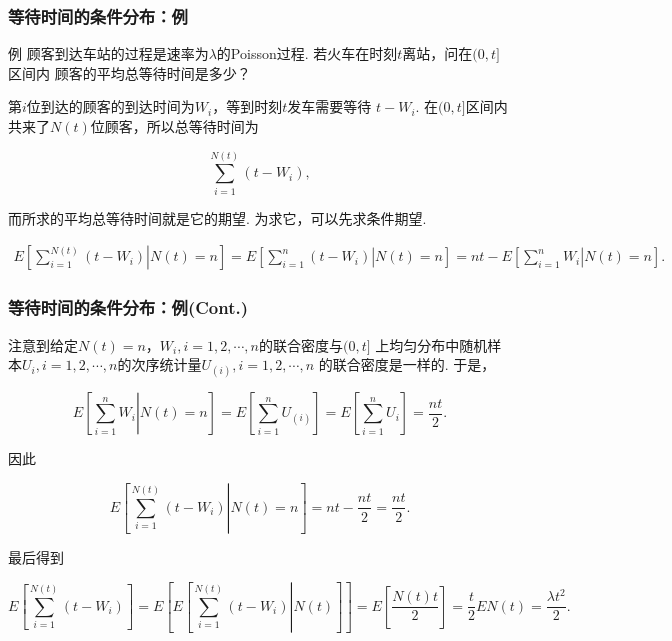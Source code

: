 \begin{frame}
    \frametitle{等待时间的条件分布：例}
    \begin{exampleblock}{例}
        顾客到达车站的过程是速率为$\lambda$的Poisson过程.
        若火车在时刻$t$离站，问在$(0,t]$区间内
        顾客的平均总等待时间是多少？
    \end{exampleblock}
    第$i$位到达的顾客的到达时间为$W_i$，等到时刻$t$发车需要等待
    $t-W_i$. 在$(0,t]$区间内共来了$N(t)$位顾客，所以总等待时间为
    \begin{small}
    \begin{equation*}
        \sum_{i=1}^{N(t)}(t-W_i),
    \end{equation*}
    \end{small}
    而所求的平均总等待时间就是它的期望. 为求它，可以先求条件期望.
    \begin{small}
    \begin{align*}
        E\left[\left.\sum_{i=1}^{N(t)}(t-W_i)\right|N(t)=n\right]
        =E\left[\left.\sum_{i=1}^{n}(t-W_i)\right|N(t)=n\right]
        =nt-E\left[\left.\sum_{i=1}^nW_i\right|N(t)=n\right].
    \end{align*}
    \end{small}
\end{frame}

\begin{frame}
    \frametitle{等待时间的条件分布：例(Cont.)}
    注意到给定$N(t)=n$，$W_i,i=1,2,\cdots,n$的联合密度与$(0,t]$
    上均匀分布中随机样本$U_i,i=1,2,\cdots,n$的次序统计量$U_{(i)},i=1,2,\cdots,n$
    的联合密度是一样的. 于是，
    \begin{small}
        \begin{equation*}
            E\left[\left.\sum_{i=1}^nW_i\right|N(t)=n\right]
            =E\left[\sum_{i=1}^n U_{(i)}\right]
            =E\left[\sum_{i=1}^n U_{i}\right]
            =\frac{nt}2.
        \end{equation*}        
    \end{small}
    因此
    \begin{small}
        \begin{equation*}
            E\left[\left.\sum_{i=1}^{N(t)}(t-W_i)\right|N(t)=n\right]=nt-\frac{nt}2=\frac{nt}2.
        \end{equation*}        
    \end{small}
    最后得到
    \begin{small}
        \begin{equation*}
            E\left[\sum_{i=1}^{N(t)}(t-W_i)\right]
            =E\left[E\left[\left.\sum_{i=1}^{N(t)}(t-W_i)\right|N(t)\right]\right]
            =E\left[\frac{N(t)t}2\right]
            =\frac t2EN(t)=\frac{\lambda t^2}{2}.
        \end{equation*}
    \end{small}
\end{frame}

